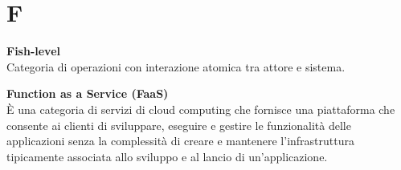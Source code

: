 \section{F}
\textbf{Fish-level}\\
Categoria di operazioni con interazione atomica tra attore e sistema.

\textbf{Function as a Service (FaaS)}\\
È una categoria di servizi di cloud computing che fornisce una piattaforma che consente ai clienti di sviluppare, eseguire e gestire le funzionalità delle applicazioni senza la complessità di creare e mantenere l'infrastruttura tipicamente associata allo sviluppo e al lancio di un'applicazione.

\clearpage